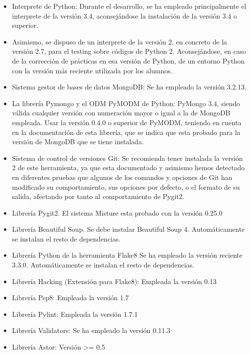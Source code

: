 \begin{itemize}
\item Interprete de Python:	Durante el desarrollo, se ha empleado principalmente el interprete de la versión 3.4, aconsejándose la instalación de la versión 3.4 o superior.

\item Asimismo, se dispuso de un interprete de la versión 2, en concreto de la versión 2.7, para el testing sobre códigos de Python 2. Aconsejándose, en caso de la corrección de prácticas en esa versión de Python, de un entorno Python con la versión más reciente utilizada por los alumnos.

\item Sistema gestor de bases de datos MongoDB: Se ha empleado la versión 3.2.13.

\item La librería Pymongo y el ODM PyMODM de Python: PyMongo 3.4, siendo válida cualquier versión con numeración mayor o igual a la de MongoDB empleada.
	Usar la versión 0.4.0 o superior de PyMODM, teniendo en cuenta en la documentación de esta librería, que se indica que esta probado para la versión de MongoDB que se tiene instalada.	

\item Sistema de control de versiones Git: Se recomienda tener instalada la versión 2 de este herramienta, ya que esta documentado y asimismo hemos detectado en diferentes pruebas que algunos de los comandos y opciones de Git han modificado su comportamiento, sus opciones por defecto, o el formato de su salida, afectando por tanto al comportamiento de Pygit2.

\item Librería Pygit2. El sistema Misture esta probado con la versión 0.25.0

\item Librería Beautiful Soup.
	Se debe instalar Beautiful Soup 4.
	Automáticamente se instalan el resto de dependencias.

\item Librería Python de la herramienta Flake8
	Se ha empleado la versión reciente 3.3.0.
	Automáticamente se instalan el resto de dependencias.
	
\item Librería Hacking (Extensión para Flake8): Empleada la versión 0.13

\item Librería Pep8: Empleada la versión 1.7

\item Librería Pylint: Empleada la versión 1.7.1

\item Librería Validators: Se ha empleado la versión 0.11.3

\item Librería Astor: Versión >= 0.5
\end{itemize}
